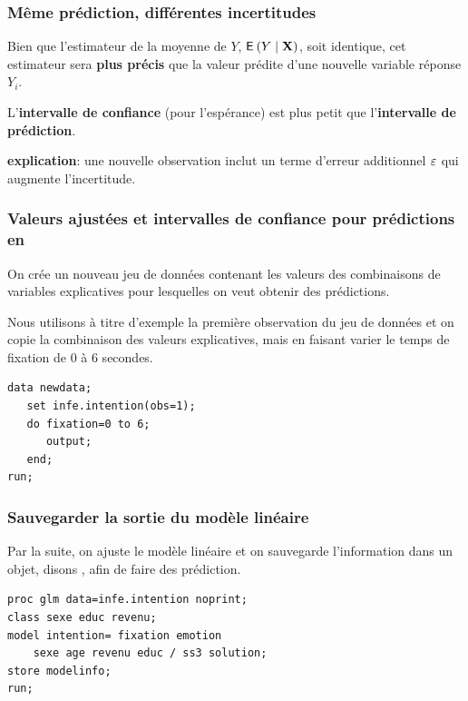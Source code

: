 \documentclass[xcolor={dvipsnames}]{beamer}
\begin{document}
\begin{frame}
\frametitle{Même prédiction, différentes incertitudes}
\bi \item
 Bien que l'estimateur de la moyenne de $Y$, ${\mathsf E}_{}\left(Y \mid \mathbf{X}\right)$, soit identique, cet estimateur sera \alert{\textbf{plus précis}} que la valeur prédite d'une nouvelle variable réponse $Y_i$.
\item L'\textbf{intervalle de confiance} (pour l'espérance) est plus petit que l'\textbf{intervalle de prédiction}.
\bi \item \textbf{explication}: une nouvelle observation inclut un terme d'erreur additionnel $\varepsilon$ qui augmente l'incertitude.
\ei
 \ei
\end{frame}

\begin{frame}[fragile]
\frametitle{Valeurs ajustées et intervalles de confiance pour prédictions en \SASlang}
\bi
\item On crée un nouveau jeu de données  contenant les valeurs des combinaisons de variables explicatives pour lesquelles on veut obtenir des prédictions. 
\item Nous utilisons à titre d'exemple la première observation du jeu de données et on copie la combinaison des valeurs explicatives, mais en faisant varier le temps de fixation de $0$ à $6$ secondes.
\ei
\begin{tcolorbox}[colback=white, colframe=hecblue, title=Code \SASlang pour créer un nouveau jeu de données]
\begin{verbatim}
data newdata;
   set infe.intention(obs=1);
   do fixation=0 to 6;
      output;
   end;
run;
\end{verbatim}
\end{tcolorbox}
\end{frame}

\begin{frame}[fragile]
\frametitle{Sauvegarder la sortie du modèle linéaire}
\bi
\item Par la suite, on ajuste le modèle linéaire et on sauvegarde l'information dans un objet, disons , afin de faire des prédiction.
\ei
\begin{tcolorbox}[colback=white, colframe=hecblue, title=Code \SASlang pour enregistrer la sortie du modèle linéaire]
\begin{verbatim}
proc glm data=infe.intention noprint;
class sexe educ revenu;
model intention= fixation emotion 
    sexe age revenu educ / ss3 solution;
store modelinfo; 
run;
\end{verbatim}
\end{tcolorbox}
\end{frame}
\end{document}
